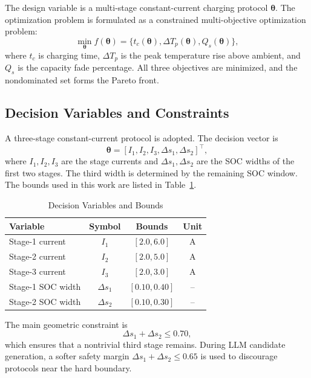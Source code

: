 \documentclass[journal]{IEEEtran}
\newcommand{\btheta}{\boldsymbol{\theta}}
\begin{document}
The design variable is a multi-stage constant-current charging protocol
$\btheta$. The optimization problem is formulated as a constrained
multi-objective optimization problem:
\begin{equation}
\min_{\btheta} f(\btheta)=
\{t_c(\btheta),\Delta T_p(\btheta),Q_s(\btheta)\},
\label{eq:cmop}
\end{equation}
where $t_c$ is charging time, $\Delta T_p$ is the peak temperature rise above
ambient, and $Q_s$ is the capacity fade percentage. All three objectives are
minimized, and the nondominated set forms the Pareto front.

\subsection{Decision Variables and Constraints}

A three-stage constant-current protocol is adopted. The decision vector is
\begin{equation}
\btheta=[I_1,I_2,I_3,\Delta s_1,\Delta s_2]^\top ,
\label{eq:theta}
\end{equation}
where $I_1,I_2,I_3$ are the stage currents and $\Delta s_1,\Delta s_2$ are the
SOC widths of the first two stages. The third width is determined by the
remaining SOC window. The bounds used in this work are listed in
Table~\ref{tab:variables}.

\begin{table}[htbp]
\caption{Decision Variables and Bounds}
\label{tab:variables}
\centering
\begin{tabular}{lccc}
\toprule
Variable & Symbol & Bounds & Unit \\
\midrule
Stage-1 current & $I_1$ & $[2.0,6.0]$ & A \\
Stage-2 current & $I_2$ & $[2.0,5.0]$ & A \\
Stage-3 current & $I_3$ & $[2.0,3.0]$ & A \\
Stage-1 SOC width & $\Delta s_1$ & $[0.10,0.40]$ & -- \\
Stage-2 SOC width & $\Delta s_2$ & $[0.10,0.30]$ & -- \\
\bottomrule
\end{tabular}
\end{table}

The main geometric constraint is
\begin{equation}
\Delta s_1+\Delta s_2 \leq 0.70,
\label{eq:dsoc}
\end{equation}
which ensures that a nontrivial third stage remains. During LLM candidate
generation, a softer safety margin $\Delta s_1+\Delta s_2 \leq 0.65$ is used to
discourage protocols near the hard boundary.
\end{document}
